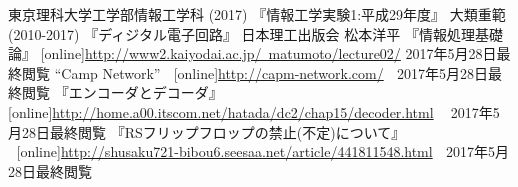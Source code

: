 \begin{thebibliography}{9}
     東京理科大学工学部情報工学科 (2017) 『情報工学実験1:平成29年度』
     大類重範 (2010-2017) 『ディジタル電子回路』 日本理工出版会
     松本洋平 『情報処理基礎論』 [online]\underline{http://www2.kaiyodai.ac.jp/~matumoto/lecture02/}
    2017年5月28日最終閲覧
     ``Camp Network'' $\;$   [online]\underline{http://capm-network.com/} $\;$ 2017年5月28日最終閲覧
     『エンコーダとデコーダ』$\;$ [online]\underline{http://home.a00.itscom.net/hatada/dc2/chap15/decoder.html} $\;\;$ 2017年5月28日最終閲覧
     『RSフリップフロップの禁止(不定)について』\\ $\;$  [online]\underline{http://shusaku721-bibou6.seesaa.net/article/441811548.html} $\;$ 2017年5月28日最終閲覧
\end{thebibliography}


